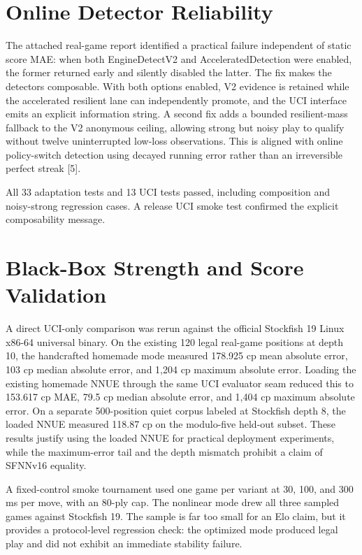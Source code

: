 \documentclass[conference]{IEEEtran}
\begin{document}
\section{Online Detector Reliability}
The attached real-game report identified a practical failure independent of static score MAE: when both EngineDetectV2 and AcceleratedDetection were enabled, the former returned early and silently disabled the latter. The fix makes the detectors composable. With both options enabled, V2 evidence is retained while the accelerated resilient lane can independently promote, and the UCI interface emits an explicit information string. A second fix adds a bounded resilient-mass fallback to the V2 anonymous ceiling, allowing strong but noisy play to qualify without twelve uninterrupted low-loss observations. This is aligned with online policy-switch detection using decayed running error rather than an irreversible perfect streak [5].

All 33 adaptation tests and 13 UCI tests passed, including composition and noisy-strong regression cases. A release UCI smoke test confirmed the explicit composability message.

\section{Black-Box Strength and Score Validation}
A direct UCI-only comparison was rerun against the official Stockfish 19 Linux x86-64 universal binary. On the existing 120 legal real-game positions at depth 10, the handcrafted homemade mode measured 178.925 cp mean absolute error, 103 cp median absolute error, and 1,204 cp maximum absolute error. Loading the existing homemade NNUE through the same UCI evaluator seam reduced this to 153.617 cp MAE, 79.5 cp median absolute error, and 1,404 cp maximum absolute error. On a separate 500-position quiet corpus labeled at Stockfish depth 8, the loaded NNUE measured 118.87 cp on the modulo-five held-out subset. These results justify using the loaded NNUE for practical deployment experiments, while the maximum-error tail and the depth mismatch prohibit a claim of SFNNv16 equality.

A fixed-control smoke tournament used one game per variant at 30, 100, and 300 ms per move, with an 80-ply cap. The nonlinear mode drew all three sampled games against Stockfish 19. The sample is far too small for an Elo claim, but it provides a protocol-level regression check: the optimized mode produced legal play and did not exhibit an immediate stability failure.
\end{document}
